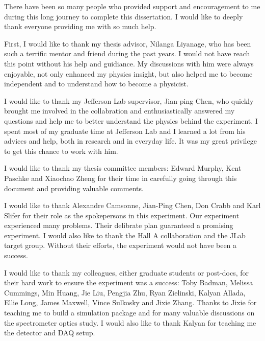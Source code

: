 

There have been so many people who provided support and encouragement to me during this long journey to complete this dissertation. I would like to deeply thank everyone providing me with so much help.

First, I would like to thank my thesis advisor, Nilanga Liyanage, who has been such a terrific mentor and friend during the past years. I would not have reach this point without his help and guidiance. My discussions with him were always enjoyable, not only enhanced my physics insight, but also helped me to become independent and to understand how to become a physicist.

I would like to thank my Jefferson Lab supervisor, Jian-ping Chen, who quickly brought me involved in the collabration and enthusiastically answered my questions and help me to better understand the physics behind the experiment. I spent most of my graduate time at Jefferson Lab and I learned a lot from his advices and help, both in research and in everyday life. It was my great privilege to get this chance to work with him.

I would like to thank my thesis committee members: Edward Murphy, Kent Paschke and Xiaochao Zheng for their time in carefully going through this document and providing valuable comments.

I would like to thank Alexandre Camsonne, Jian-Ping Chen, Don Crabb and Karl Slifer for their role as the spokepersons in this experiment. Our experiment experienced many problems. Their delibrate plan guaranteed a promising experiment. I would also like to thank the Hall A collaboration and the JLab target group. Without their efforts, the experiment would not have been a success.

I would like to thank my colleagues, either graduate students or post-docs, for their hard work to ensure the experiment was a success: Toby Badman, Melissa Cummings, Min Huang, Jie Liu, Pengjia Zhu, Ryan Zielinski, Kalyan Allada, Ellie Long, James Maxwell, Vince Sulkosky and Jixie Zhang. Thanks to Jixie for teaching me to build a simulation package and for many valuable discussions on the spectrometer optics study. I would also like to thank Kalyan for teaching me the detector and DAQ setup.

